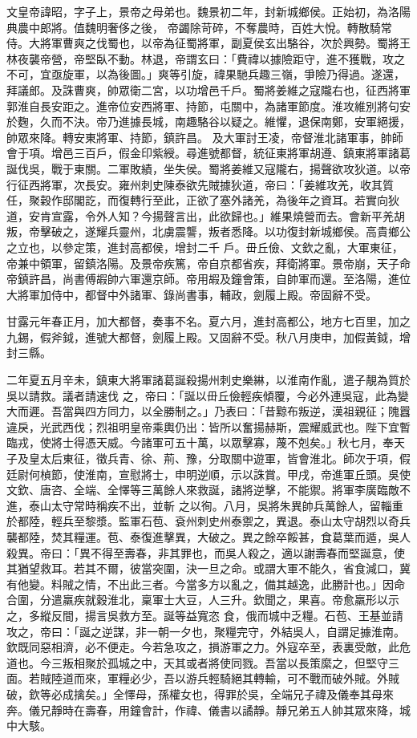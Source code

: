 \begin{pinyinscope}
 文皇帝諱昭，字子上，景帝之母弟也。魏景初二年，封新城鄉侯。正始初，為洛陽典農中郎將。值魏明奢侈之後，
 帝蠲除苛碎，不奪農時，百姓大悅。轉散騎常侍。大將軍曹爽之伐蜀也，以帝為征蜀將軍，副夏侯玄出駱谷，次於興勢。蜀將王林夜襲帝營，帝堅臥不動。林退，帝謂玄曰：「費禕以據險距守，進不獲戰，攻之不可，宜亟旋軍，以為後圖。」爽等引旋，禕果馳兵趣三嶺，爭險乃得過。遂還，拜議郎。及誅曹爽，帥眾衛二宮，以功增邑千戶。蜀將姜維之寇隴右也，征西將軍郭淮自長安距之。進帝位安西將軍、持節，屯關中，為諸軍節度。淮攻維別將句安於麴，久而不決。帝乃進據長城，南趣駱谷以疑之。維懼，退保南鄭，安軍絕援，帥眾來降。轉安東將軍、持節，鎮許昌。
 及大軍討王凌，帝督淮北諸軍事，帥師會于項。增邑三百戶，假金印紫綬。尋進號都督，統征東將軍胡遵、鎮東將軍諸葛誕伐吳，戰于東關。二軍敗績，坐失侯。蜀將姜維又寇隴右，揚聲欲攻狄道。以帝行征西將軍，次長安。雍州刺史陳泰欲先賊據狄道，帝曰：「姜維攻羌，收其質任，聚穀作邸閣訖，而復轉行至此，正欲了塞外諸羌，為後年之資耳。若實向狄道，安肯宣露，令外人知？今揚聲言出，此欲歸也。」維果燒營而去。會新平羌胡叛，帝擊破之，遂耀兵靈州，北虜震讋，叛者悉降。以功復封新城鄉侯。高貴鄉公之立也，以參定策，進封高都侯，增封二千
 戶。毌丘儉、文欽之亂，大軍東征，帝兼中領軍，留鎮洛陽。及景帝疾篤，帝自京都省疾，拜衛將軍。景帝崩，天子命帝鎮許昌，尚書傅嘏帥六軍還京師。帝用嘏及鐘會策，自帥軍而還。至洛陽，進位大將軍加侍中，都督中外諸軍、錄尚書事，輔政，劍履上殿。帝固辭不受。



 甘露元年春正月，加大都督，奏事不名。夏六月，進封高都公，地方七百里，加之九錫，假斧鉞，進號大都督，劍履上殿。又固辭不受。秋八月庚申，加假黃鉞，增封三縣。



 二年夏五月辛未，鎮東大將軍諸葛誕殺揚州刺史樂綝，以淮南作亂，遣子靚為質於吳以請救。議者請速伐
 之，帝曰：「誕以毌丘儉輕疾傾覆，今必外連吳寇，此為變大而遲。吾當與四方同力，以全勝制之。」乃表曰：「昔黥布叛逆，漢祖親征；隗囂違戾，光武西伐；烈祖明皇帝乘輿仍出：皆所以奮揚赫斯，震耀威武也。陛下宜暫臨戎，使將士得憑天威。今諸軍可五十萬，以眾擊寡，蔑不剋矣。」秋七月，奉天子及皇太后東征，徵兵青、徐、荊、豫，分取關中遊軍，皆會淮北。師次于項，假廷尉何楨節，使淮南，宣慰將士，申明逆順，示以誅賞。甲戌，帝進軍丘頭。吳使文欽、唐咨、全端、全懌等三萬餘人來救誕，諸將逆擊，不能禦。將軍李廣臨敵不進，泰山太守常時稱疾不出，並斬
 之以徇。八月，吳將朱異帥兵萬餘人，留輜重於都陸，輕兵至黎漿。監軍石苞、袞州刺史州泰禦之，異退。泰山太守胡烈以奇兵襲都陸，焚其糧運。苞、泰復進擊異，大破之。異之餘卒餒甚，食葛葉而遁，吳人殺異。帝曰：「異不得至壽春，非其罪也，而吳人殺之，適以謝壽春而堅誕意，使其猶望救耳。若其不爾，彼當突圍，決一旦之命。或謂大軍不能久，省食減口，冀有他變。料賊之情，不出此三者。今當多方以亂之，備其越逸，此勝計也。」因命合圍，分遣羸疾就穀淮北，稟軍士大豆，人三升。欽聞之，果喜。帝愈羸形以示之，多縱反間，揚言吳救方至。誕等益寬恣
 食，俄而城中乏糧。石苞、王基並請攻之，帝曰：「誕之逆謀，非一朝一夕也，聚糧完守，外結吳人，自謂足據淮南。欽既同惡相濟，必不便走。今若急攻之，損游軍之力。外寇卒至，表裏受敵，此危道也。今三叛相聚於孤城之中，天其或者將使同戮。吾當以長策縻之，但堅守三面。若賊陸道而來，軍糧必少，吾以游兵輕騎絕其轉輸，可不戰而破外賊。外賊破，欽等必成擒矣。」全懌母，孫權女也，得罪於吳，全端兄子禕及儀奉其母來奔。儀兄靜時在壽春，用鐘會計，作禕、儀書以譎靜。靜兄弟五人帥其眾來降，城中大駭。




\end{pinyinscope}
